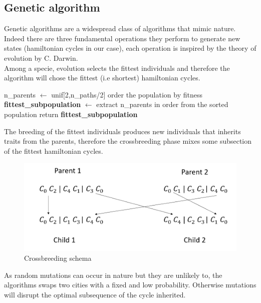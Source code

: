 \documentclass{article}
\begin{document}
\subsection{Genetic algorithm}
Genetic algorithms are a widespread class of algorithms that mimic nature. Indeed there are three fundamental operations they perform to generate new states (hamiltonian cycles in our case), each operation is inspired by the theory of evolution by C. Darwin. \\
Among a specie, evolution selects the fittest individuals and therefore the algorithm will chose the fittest (i.e shortest) hamiltonian cycles. \\
\begin{algorithm}[H]
    \begin{algorithmic}[1]
        \State n\_parents $\leftarrow$ unif[2,n\_paths/2]
        \State order the population by fitness
        \State \textbf{fittest\_subpopulation} $\leftarrow$ extract n\_parents in order from the sorted population
        \State return \textbf{fittest\_subpopulation}
       \EndFunction
\end{algorithmic}
\end{algorithm}
\noindent The breeding of the fittest individuals produces new individuals that inherits traits from the parents, therefore the crossbreeding phase mixes some subsection of the fittest hamiltonian cycles. \\
\begin{figure}[H]\includegraphics[scale=0.5]{crossbreeding.png} 
\centering
\caption{Crossbreeding schema}
\end{figure}

\noindent As random mutations can occur in nature but they are unlikely to, the algorithms swaps two cities with a fixed and low probability. Otherwise mutations will disrupt the optimal subsequence of the cycle inherited. \\
\end{document}
